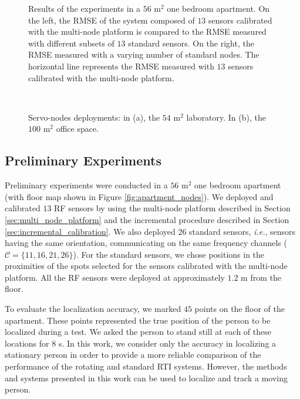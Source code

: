 \documentclass[conference]{IEEEtran}
\begin{document}
\begin{figure}[t]
    \begin{center}
        \caption{Results of the experiments in a $56$ m$^2$ one bedroom apartment. On the left, the RMSE of the system composed of $13$ sensors calibrated with the multi-node platform is compared to the RMSE measured with different subsets of $13$ standard sensors. On the right, the RMSE measured with a varying number of standard nodes. The horizontal line represents the RMSE measured with $13$ sensors calibrated with the multi-node platform.}
        \label{fig:apt_218_RMSE_results}
    \end{center}
\end{figure}

\begin{figure*}[t]
    \begin{center}
        \mbox{
             \quad
        }
        \caption{Servo-nodes deployments: in (a), the $54$ m$^2$ laboratory. In (b), the $100$ m$^2$ office space.}
        \label{fig:deployment_environments}
    \end{center}
\end{figure*}

\subsection{Preliminary Experiments}
\label{sec:one_bedroom_apartment_deployment}

Preliminary experiments were conducted in a $56$ m$^2$ one bedroom apartment (with floor map shown in Figure \ref{fig:apartment_nodes}). We deployed and calibrated $13$ RF sensors by using the multi-node platform described in Section \ref{sec:multi_node_platform} and the incremental procedure described in Section \ref{sec:incremental_calibration}. We also deployed $26$ standard sensors, \emph{i.e.}, sensors having the same orientation, communicating on the same frequency channels ($\mathcal{C} = \{11,16,21,26\}$). For the standard sensors, we chose positions in the proximities of the spots selected for the sensors calibrated with the multi-node platform. All the RF sensors were deployed at approximately $1.2$ m from the floor.

To evaluate the localization accuracy, we marked $45$ points on the floor of the apartment. These points represented the true position of the person to be localized during a test. We asked the person to stand still at each of these locations for $8$ s. In this work, we consider only the accuracy in localizing a stationary person in order to provide a more reliable comparison of the performance of the rotating and standard RTI systems. However, the methods and systems presented in this work can be used to localize and track a moving person.
\end{document}
